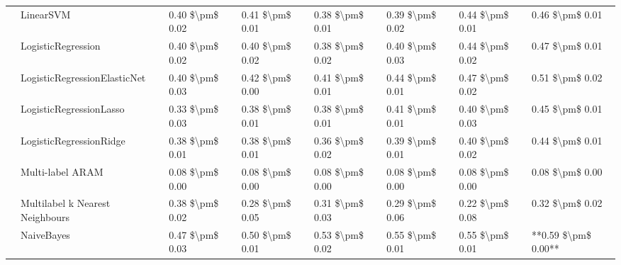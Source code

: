 \begin{tabular}{llllllll}
   & LinearSVM &  0.40 \$\textbackslash pm\$ 0.02 &           0.41 \$\textbackslash pm\$ 0.01 &       0.38 \$\textbackslash pm\$ 0.01 &        0.39 \$\textbackslash pm\$ 0.02 &                         0.44 \$\textbackslash pm\$ 0.01 &      0.46 \$\textbackslash pm\$ 0.01 \\
   & LogisticRegression &  0.40 \$\textbackslash pm\$ 0.02 &           0.40 \$\textbackslash pm\$ 0.02 &       0.38 \$\textbackslash pm\$ 0.02 &        0.40 \$\textbackslash pm\$ 0.03 &                         0.44 \$\textbackslash pm\$ 0.02 &      0.47 \$\textbackslash pm\$ 0.01 \\
   & LogisticRegressionElasticNet &  0.40 \$\textbackslash pm\$ 0.03 &           0.42 \$\textbackslash pm\$ 0.00 &       0.41 \$\textbackslash pm\$ 0.01 &        0.44 \$\textbackslash pm\$ 0.01 &                         0.47 \$\textbackslash pm\$ 0.02 &      0.51 \$\textbackslash pm\$ 0.02 \\
   & LogisticRegressionLasso &  0.33 \$\textbackslash pm\$ 0.03 &           0.38 \$\textbackslash pm\$ 0.01 &       0.38 \$\textbackslash pm\$ 0.01 &        0.41 \$\textbackslash pm\$ 0.01 &                         0.40 \$\textbackslash pm\$ 0.03 &      0.45 \$\textbackslash pm\$ 0.01 \\
   & LogisticRegressionRidge &  0.38 \$\textbackslash pm\$ 0.01 &           0.38 \$\textbackslash pm\$ 0.01 &       0.36 \$\textbackslash pm\$ 0.02 &        0.39 \$\textbackslash pm\$ 0.01 &                         0.40 \$\textbackslash pm\$ 0.02 &      0.44 \$\textbackslash pm\$ 0.01 \\
   & Multi-label ARAM &  0.08 \$\textbackslash pm\$ 0.00 &           0.08 \$\textbackslash pm\$ 0.00 &       0.08 \$\textbackslash pm\$ 0.00 &        0.08 \$\textbackslash pm\$ 0.00 &                         0.08 \$\textbackslash pm\$ 0.00 &      0.08 \$\textbackslash pm\$ 0.00 \\
   & Multilabel k Nearest Neighbours &  0.38 \$\textbackslash pm\$ 0.02 &           0.28 \$\textbackslash pm\$ 0.05 &       0.31 \$\textbackslash pm\$ 0.03 &        0.29 \$\textbackslash pm\$ 0.06 &                         0.22 \$\textbackslash pm\$ 0.08 &      0.32 \$\textbackslash pm\$ 0.02 \\
   & NaiveBayes &  0.47 \$\textbackslash pm\$ 0.03 &           0.50 \$\textbackslash pm\$ 0.01 &       0.53 \$\textbackslash pm\$ 0.02 &        0.55 \$\textbackslash pm\$ 0.01 &                         0.55 \$\textbackslash pm\$ 0.01 &  **0.59 \$\textbackslash pm\$ 0.00** \\

\end{tabular}
